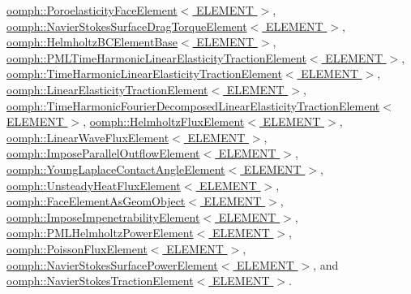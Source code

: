 \hyperlink{classoomph_1_1PoroelasticityFaceElement_af8381ad4d2c26cbc397d571ff56bc85f}{oomph\+::\+Poroelasticity\+Face\+Element$<$ E\+L\+E\+M\+E\+N\+T $>$}, \hyperlink{classoomph_1_1NavierStokesSurfaceDragTorqueElement_af864929a9dbd0ed1d464db1a1d9a93b9}{oomph\+::\+Navier\+Stokes\+Surface\+Drag\+Torque\+Element$<$ E\+L\+E\+M\+E\+N\+T $>$}, \hyperlink{classoomph_1_1HelmholtzBCElementBase_a66defe3dfc1150d37015c43c08fd93b1}{oomph\+::\+Helmholtz\+B\+C\+Element\+Base$<$ E\+L\+E\+M\+E\+N\+T $>$}, \hyperlink{classoomph_1_1PMLTimeHarmonicLinearElasticityTractionElement_a035a8fcd22c01966f16e83e7c3517569}{oomph\+::\+P\+M\+L\+Time\+Harmonic\+Linear\+Elasticity\+Traction\+Element$<$ E\+L\+E\+M\+E\+N\+T $>$}, \hyperlink{classoomph_1_1TimeHarmonicLinearElasticityTractionElement_a6477822c4cd242cccaacaea672155b8f}{oomph\+::\+Time\+Harmonic\+Linear\+Elasticity\+Traction\+Element$<$ E\+L\+E\+M\+E\+N\+T $>$}, \hyperlink{classoomph_1_1LinearElasticityTractionElement_a1e9b037926aad0682fd195bb5a9d4f55}{oomph\+::\+Linear\+Elasticity\+Traction\+Element$<$ E\+L\+E\+M\+E\+N\+T $>$}, \hyperlink{classoomph_1_1TimeHarmonicFourierDecomposedLinearElasticityTractionElement_aac54793d84bff0a227ee5fefa279b7ad}{oomph\+::\+Time\+Harmonic\+Fourier\+Decomposed\+Linear\+Elasticity\+Traction\+Element$<$ E\+L\+E\+M\+E\+N\+T $>$}, \hyperlink{classoomph_1_1HelmholtzFluxElement_a02ce0bfabe6ce7ef3901bb4155806d86}{oomph\+::\+Helmholtz\+Flux\+Element$<$ E\+L\+E\+M\+E\+N\+T $>$}, \hyperlink{classoomph_1_1LinearWaveFluxElement_a6fb1a0846c91406e86f598c8eb0fafb2}{oomph\+::\+Linear\+Wave\+Flux\+Element$<$ E\+L\+E\+M\+E\+N\+T $>$}, \hyperlink{classoomph_1_1ImposeParallelOutflowElement_afa3691d3309b635967e81461b7db8173}{oomph\+::\+Impose\+Parallel\+Outflow\+Element$<$ E\+L\+E\+M\+E\+N\+T $>$}, \hyperlink{classoomph_1_1YoungLaplaceContactAngleElement_ac6e3f26da35682eb715693755b661a5c}{oomph\+::\+Young\+Laplace\+Contact\+Angle\+Element$<$ E\+L\+E\+M\+E\+N\+T $>$}, \hyperlink{classoomph_1_1UnsteadyHeatFluxElement_a5ee386604e4a99eb2daa220c98f17513}{oomph\+::\+Unsteady\+Heat\+Flux\+Element$<$ E\+L\+E\+M\+E\+N\+T $>$}, \hyperlink{classoomph_1_1FaceElementAsGeomObject_aa5971a8b6d24780bfc3c05be7a88852d}{oomph\+::\+Face\+Element\+As\+Geom\+Object$<$ E\+L\+E\+M\+E\+N\+T $>$}, \hyperlink{classoomph_1_1ImposeImpenetrabilityElement_acd1ef4e239729447691ba0b973e395ae}{oomph\+::\+Impose\+Impenetrability\+Element$<$ E\+L\+E\+M\+E\+N\+T $>$}, \hyperlink{classoomph_1_1PMLHelmholtzPowerElement_a5ee9ddb45e780e47245fc31b7f38ba19}{oomph\+::\+P\+M\+L\+Helmholtz\+Power\+Element$<$ E\+L\+E\+M\+E\+N\+T $>$}, \hyperlink{classoomph_1_1PoissonFluxElement_acf4651fa89a7f6c5a23c1960423dc8e6}{oomph\+::\+Poisson\+Flux\+Element$<$ E\+L\+E\+M\+E\+N\+T $>$}, \hyperlink{classoomph_1_1NavierStokesSurfacePowerElement_add4a49170201b878ed97449dd3d55a42}{oomph\+::\+Navier\+Stokes\+Surface\+Power\+Element$<$ E\+L\+E\+M\+E\+N\+T $>$}, and \hyperlink{classoomph_1_1NavierStokesTractionElement_a8ddd7c891c2654ea277fc569b4a0725a}{oomph\+::\+Navier\+Stokes\+Traction\+Element$<$ E\+L\+E\+M\+E\+N\+T $>$}.




